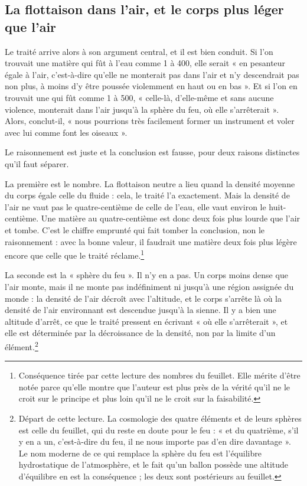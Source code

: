 \documentclass[11pt,a4paper]{article}
\begin{document}
\subsection*{La flottaison dans l'air, et le corps plus léger que l'air}

Le traité arrive alors à son argument central, et il est bien conduit. Si l'on
trouvait une matière qui fût à l'eau comme 1 à 400, elle serait « en pesanteur
égale à l'air, c'est-à-dire qu'elle ne monterait pas dans l'air et n'y
descendrait pas non plus, à moins d'y être poussée violemment en haut ou en
bas ». Et si l'on en trouvait une qui fût comme 1 à 500, « celle-là, d'elle-même
et sans aucune violence, monterait dans l'air jusqu'à la sphère du feu, où elle
s'arrêterait ». Alors, conclut-il, « nous pourrions très facilement former un
instrument et voler avec lui comme font les oiseaux ».

Le raisonnement est juste et la conclusion est fausse, pour deux raisons
distinctes qu'il faut séparer.

La première est le nombre. La flottaison neutre a lieu quand la densité moyenne
du corps égale celle du fluide : cela, le traité l'a exactement. Mais la densité
de l'air ne vaut pas le quatre-centième de celle de l'eau, elle vaut environ le
huit-centième. Une matière au quatre-centième est donc deux fois plus lourde que
l'air et tombe. C'est le chiffre emprunté qui fait tomber la conclusion, non le
raisonnement : avec la bonne valeur, il faudrait une matière deux fois plus
légère encore que celle que le traité réclame.\footnote{Conséquence tirée par
cette lecture des nombres du feuillet. Elle mérite d'être notée parce qu'elle
montre que l'auteur est plus près de la vérité qu'il ne le croit sur le principe
et plus loin qu'il ne le croit sur la faisabilité.}

La seconde est la « sphère du feu ». Il n'y en a pas. Un corps moins dense que
l'air monte, mais il ne monte pas indéfiniment ni jusqu'à une région assignée du
monde : la densité de l'air décroît avec l'altitude, et le corps s'arrête là où
la densité de l'air environnant est descendue jusqu'à la sienne. Il y a bien une
altitude d'arrêt, ce que le traité pressent en écrivant « où elle s'arrêterait »,
et elle est déterminée par la décroissance de la densité, non par la limite d'un
élément.\footnote{Départ de cette lecture. La cosmologie des quatre éléments et
de leurs sphères est celle du feuillet, qui du reste en doute pour le feu : « et
du quatrième, s'il y en a un, c'est-à-dire du feu, il ne nous importe pas d'en
dire davantage ». Le nom moderne de ce qui remplace la sphère du feu est
l'équilibre hydrostatique de l'atmosphère, et le fait qu'un ballon possède une
altitude d'équilibre en est la conséquence ; les deux sont postérieurs au
feuillet.}
\end{document}
